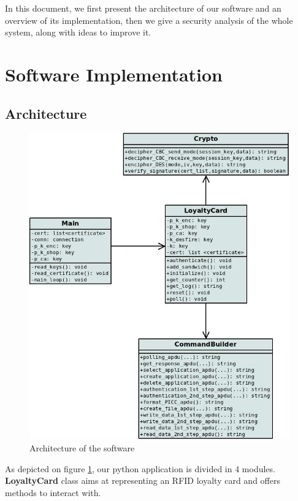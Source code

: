 \documentclass[a4paper,11pt,oneside]{article}
\begin{document}
In this document, we first present the architecture of our software and an overview of its implementation, then we give a security analysis of the whole system, along with ideas to improve it. \\


\section{Software Implementation}

\subsection{Architecture}

\begin{figure}[!ht]
	\centering
	\includegraphics[scale=0.50]{Images/ClassDiagram.jpg}
	\caption{Architecture of the software}
	\label{fig:class_diagram}	
\end{figure}


As depicted on figure \ref{fig:class_diagram}, our python application is divided in 4 modules. \textbf{LoyaltyCard} class aims at representing an RFID loyalty card and offers methods to interact with. 
\end{document}
